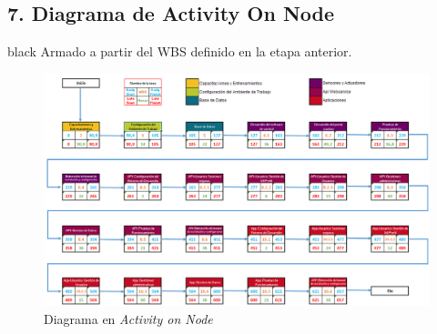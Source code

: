 \documentclass[11pt]{charter}
\begin{document}
\begin{landscape}
\section{7. Diagrama de Activity On Node}
\label{sec:AoN}

\begin{consigna}{black}
Armado a partir del WBS definido en la etapa anterior. 



\begin{figure}[htpb]
\centering 
\includegraphics[width=1.1\textwidth]{./Figuras/AoN.png}
\caption{Diagrama en \textit{Activity on Node}}
\label{fig:AoN}
\end{figure}


\end{consigna}

\end{landscape}
\end{document}
